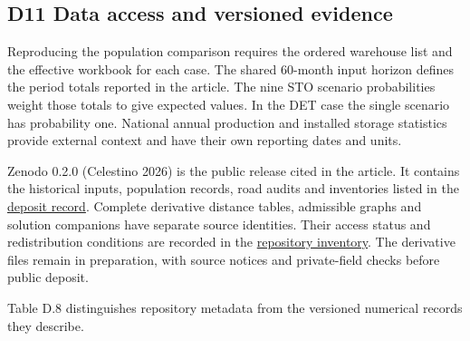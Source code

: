 \documentclass[
  english,
  11pt,
  a4paper,
]{article}
\begin{document}
\subsection{D11 Data access and versioned
evidence}\label{d11-data-access-and-versioned-evidence}

Reproducing the population comparison requires the ordered warehouse
list and the effective workbook for each case. The shared 60-month input
horizon defines the period totals reported in the article. The nine STO
scenario probabilities weight those totals to give expected values. In
the DET case the single scenario has probability one. National annual
production and installed storage statistics provide external context and
have their own reporting dates and units.

Zenodo 0.2.0 (Celestino 2026) is the public release cited in the
article. It contains the historical inputs, population records, road
audits and inventories listed in the
\href{https://doi.org/10.5281/zenodo.22751909}{deposit record}. Complete
derivative distance tables, admissible graphs and solution companions
have separate source identities. Their access status and redistribution
conditions are recorded in the
\href{https://github.com/unb-lamfo-or-ai-hpc/model-agrologistic/blob/2c1ad568bbc8eb0ee45b42ad59b5a3a442e0ab3c/data/manifests/zenodo_release_plan_20261102.json}{repository
inventory}. The derivative files remain in preparation, with source
notices and private-field checks before public deposit.

Table D.8 distinguishes repository metadata from the versioned numerical
records they describe.
\end{document}
